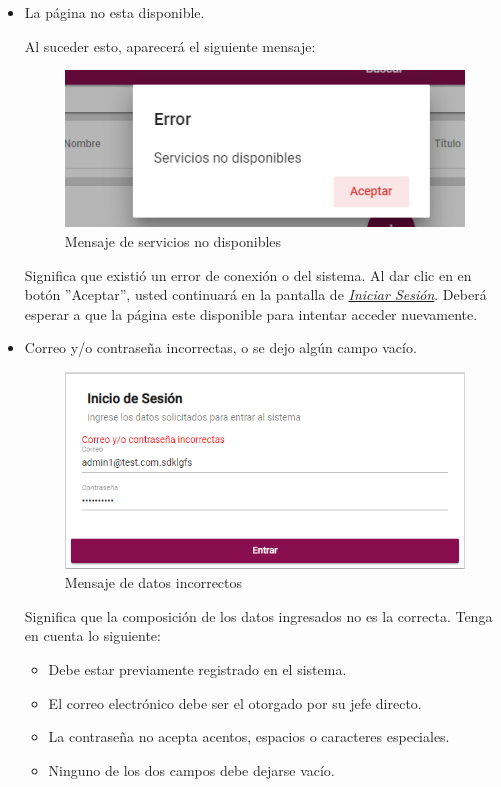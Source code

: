            \begin{itemize}
                \item La página no esta disponible.

                    Al suceder esto, aparecerá el siguiente mensaje:
                    \begin{figure}[H]
                        \centering
                        \hypertarget{MSG25}{\includegraphics[width=0.4\linewidth]{images/SP5/MSGSN}}
                        \caption{Mensaje de servicios no disponibles}
                    \end{figure}

                    Significa que existió un error de conexión o del sistema. Al dar clic en en botón ''Aceptar'', usted continuará en la pantalla de \hyperlink{iniciarL}{\textit{Iniciar Sesión}}. Deberá esperar a que la página este disponible para intentar acceder nuevamente.

                \item Correo y/o contraseña incorrectas, o se dejo algún campo vacío.
                    \begin{figure}[H]
                        \centering
                        \hypertarget{MSG0}{\includegraphics[width=0.4\linewidth]{images/SP5/LoginIncorrecto}}
                        \caption{Mensaje de datos incorrectos}
                    \end{figure}

                Significa que la composición de los datos ingresados no es la correcta. Tenga en cuenta lo siguiente:

                            \begin{itemize}
                                \item Debe estar previamente registrado en el sistema.
                                \item El correo electrónico debe ser el otorgado por su jefe directo.
                                \item La contraseña no acepta acentos, espacios o caracteres especiales.
                                \item Ninguno de los dos campos debe dejarse vacío.
                            \end{itemize}

            \end{itemize}
